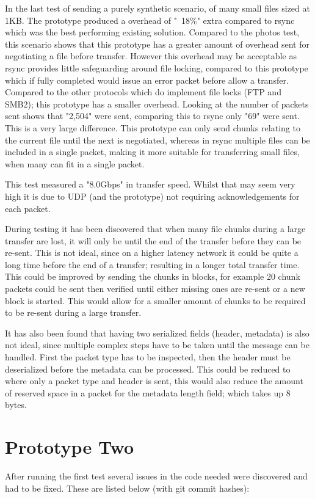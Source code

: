 In the last test of sending a purely synthetic scenario, of many small files sized at 1KB. The prototype produced a overhead of "~18\%" extra compared to rsync which was the best performing existing solution. Compared to the photos test, this scenario shows that this prototype has a greater amount of overhead sent for negotiating a file before transfer. However this overhead may be acceptable as rsync provides little safeguarding around file locking, compared to this prototype which if fully completed would issue an error packet before allow a transfer. Compared to the other protocols which do implement file locks (FTP and SMB2); this prototype has a smaller overhead. Looking at the number of packets sent shows that "2,504" were sent, comparing this to rsync only "69" were sent. This is a very large difference. This prototype can only send chunks relating to the current file until the next is negotiated, whereas in rsync multiple files can be included in a single packet, making it more suitable for transferring small files, when many can fit in a single packet.

This test measured a "8.0Gbps" in transfer speed. Whilst that may seem very high it is due to UDP (and the prototype) not requiring acknowledgements for each packet.

During testing it has been discovered that when many file chunks during a large transfer are lost, it will only be until the end of the transfer before they can be re-sent. This is not ideal, since on a higher latency network it could be quite a long time before the end of a transfer; resulting in a longer total transfer time. This could be improved by sending the chunks in blocks, for example 20 chunk packets could be sent then verified until either missing ones are re-sent or a new block is started. This would allow for a smaller amount of chunks to be required to be re-sent during a large transfer.

It has also been found that having two serialized fields (header, metadata) is also not ideal, since multiple complex steps have to be taken until the message can be handled. First the packet type has to be inspected, then the header must be deserialized before the metadata can be processed. This could be reduced to where only a packet type and header is sent, this would also reduce the amount of reserved space in a packet for the metadata length field; which takes up 8 bytes.


\section{Prototype Two}
After running the first test several issues in the code needed were discovered and had to be fixed. These are listed below (with git commit hashes):

